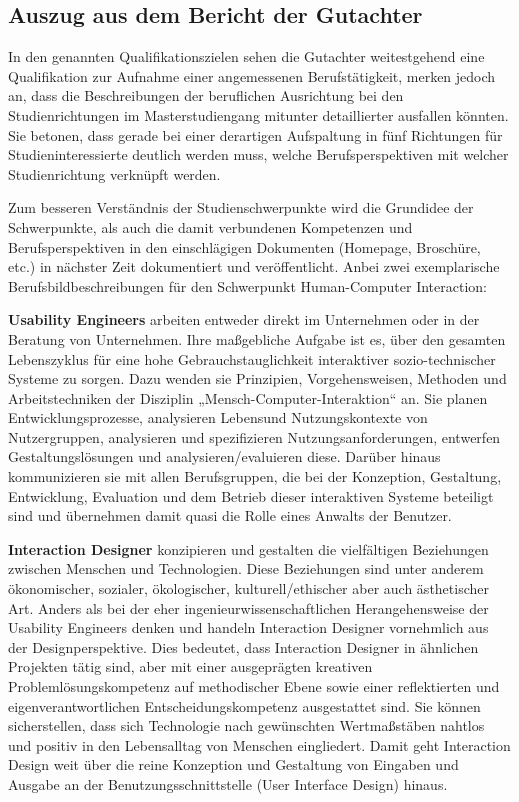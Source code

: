 \subsection{Auszug aus dem Bericht der
Gutachter\label{/mi-2017/selbstbericht/auflagen/0000-auflagen}}\label{auszug-aus-dem-bericht-der-gutachterpathlabelmi-2017selbstberichtauflagen0000-auflagen}

\begin{siderules}
In den genannten Qualifikationszielen sehen die Gutachter weitestgehend
eine Qualifikation zur Aufnahme einer angemessenen Berufstätigkeit,
merken jedoch an, dass die Beschreibungen der beruflichen Ausrichtung
bei den Studienrichtungen im Masterstudiengang mitunter detaillierter
ausfallen könnten. Sie betonen, dass gerade bei einer derartigen
Aufspaltung in fünf Richtungen für Studieninteressierte deutlich werden
muss, welche Berufsperspektiven mit welcher Studienrichtung verknüpft
werden.
\end{siderules}

Zum besseren Verständnis der Studienschwerpunkte wird die Grundidee der
Schwerpunkte, als auch die damit verbundenen Kompetenzen und
Berufsperspektiven in den einschlägigen Dokumenten (Homepage, Broschüre,
etc.) in nächster Zeit dokumentiert und veröffentlicht. Anbei zwei
exemplarische Berufsbildbeschreibungen für den Schwerpunkt
Human-Computer Interaction:

\textbf{Usability Engineers} arbeiten entweder direkt im Unternehmen
oder in der Beratung von Unternehmen. Ihre maßgebliche Aufgabe ist es,
über den gesamten Lebenszyklus für eine hohe Gebrauchstauglichkeit
interaktiver sozio-technischer Systeme zu sorgen. Dazu wenden sie
Prinzipien, Vorgehensweisen, Methoden und Arbeitstechniken der Disziplin
„Mensch-Computer-Interaktion`` an. Sie planen Entwicklungsprozesse,
analysieren Lebensund Nutzungskontexte von Nutzergruppen, analysieren
und spezifizieren Nutzungsanforderungen, entwerfen Gestaltungslösungen
und analysieren/evaluieren diese. Darüber hinaus kommunizieren sie mit
allen Berufsgruppen, die bei der Konzeption, Gestaltung, Entwicklung,
Evaluation und dem Betrieb dieser interaktiven Systeme beteiligt sind
und übernehmen damit quasi die Rolle eines Anwalts der Benutzer.

\textbf{Interaction Designer} konzipieren und gestalten die vielfältigen
Beziehungen zwischen Menschen und Technologien. Diese Beziehungen sind
unter anderem ökonomischer, sozialer, ökologischer, kulturell/ethischer
aber auch ästhetischer Art. Anders als bei der eher
ingenieurwissenschaftlichen Herangehensweise der Usability Engineers
denken und handeln Interaction Designer vornehmlich aus der
Designperspektive. Dies bedeutet, dass Interaction Designer in ähnlichen
Projekten tätig sind, aber mit einer ausgeprägten kreativen
Problemlösungskompetenz auf methodischer Ebene sowie einer reflektierten
und eigenverantwortlichen Entscheidungskompetenz ausgestattet sind. Sie
können sicherstellen, dass sich Technologie nach gewünschten
Wertmaßstäben nahtlos und positiv in den Lebensalltag von Menschen
eingliedert. Damit geht Interaction Design weit über die reine
Konzeption und Gestaltung von Eingaben und Ausgabe an der
Benutzungsschnittstelle (User Interface Design) hinaus.

